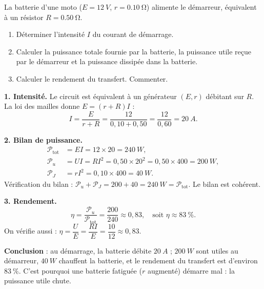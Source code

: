 \documentclass[11pt]{article}
\begin{document}
\begin{exoresolu}
La batterie d'une moto ($E = \SI{12}{V}$, $r = \SI{0,10}{\ohm}$) alimente le démarreur, équivalent à un résistor $R = \SI{0,50}{\ohm}$.
\begin{enumerate}
\item Déterminer l'intensité $I$ du courant de démarrage.
\item Calculer la puissance totale fournie par la batterie, la puissance utile reçue par le démarreur et la puissance dissipée dans la batterie.
\item Calculer le rendement du transfert. Commenter.
\end{enumerate}
\tcblower
\textbf{1. Intensité.} Le circuit est équivalent à un générateur $(E, r)$ débitant sur $R$. La loi des mailles donne $E = (r + R)I$ :
\[ I = \frac{E}{r + R} = \frac{12}{0{,}10 + 0{,}50} = \frac{12}{0{,}60} = \SI{20}{A}. \]

\textbf{2. Bilan de puissance.}
\begin{align*}
\mathcal{P}_{\text{tot}} &= EI = 12 \times 20 = \SI{240}{W}, \\
\mathcal{P}_u &= UI = RI^2 = 0{,}50 \times 20^2 = 0{,}50 \times 400 = \SI{200}{W}, \\
\mathcal{P}_J &= rI^2 = 0{,}10 \times 400 = \SI{40}{W}.
\end{align*}
Vérification du bilan : $\mathcal{P}_u + \mathcal{P}_J = 200 + 40 = \SI{240}{W} = \mathcal{P}_{\text{tot}}$. Le bilan est cohérent.

\textbf{3. Rendement.}
\[ \eta = \frac{\mathcal{P}_u}{\mathcal{P}_{\text{tot}}} = \frac{200}{240} \approx 0{,}83, \quad \text{soit } \eta \approx 83~\%. \]
On vérifie aussi : $\eta = \dfrac{U}{E} = \dfrac{RI}{E} = \dfrac{10}{12} \approx 0{,}83$.

\textbf{Conclusion} : au démarrage, la batterie débite $\SI{20}{A}$ ; $\SI{200}{W}$ sont utiles au démarreur, $\SI{40}{W}$ chauffent la batterie, et le rendement du transfert est d'environ $83~\%$. C'est pourquoi une batterie fatiguée ($r$ augmenté) démarre mal : la puissance utile chute.
\end{exoresolu}
\end{document}

